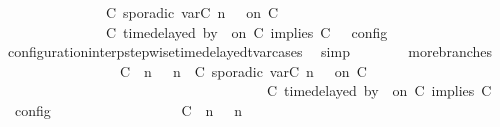 \begin{isabellebody}
\ \ \ \ \ \ \ \ \ \ \ \ \ \ {\isasymturnstile}\ {\isacharparenleft}C\ sporadic{\isasymsharp}\ {\isasymlparr}{\isasymtau}\isactrlsub v\isactrlsub a\isactrlsub r{\isacharparenleft}C\ n{\isacharparenright}\ {\isasymoplus}\ {\isasymdelta}{\isasymtau}{\isasymrparr}\ on\ C\ {\isacharhash}\ {\isasymPsi}\isanewline
\ \ \ \ \ \ \ \ \ \ \ \ \ \ {\isasymtriangleright}\ {\isacharparenleft}{\isacharparenleft}C\ time{\isacharminus}delayed{\isasymbowtie}\ by\ {\isasymdelta}{\isasymtau}\ on\ C\ implies\ C\ {\isacharhash}\ {\isasymPhi}{\isacharparenright}\ {\isasymrbrakk}\isactrlsub c\isactrlsub o\isactrlsub n\isactrlsub f\isactrlsub i\isactrlsub g{\isacartoucheclose}\isanewline
\ \ \ \ \ \ \ \ \isamarkupfalse%
\ configuration{\isacharunderscore}interp{\isacharunderscore}stepwise{\isacharunderscore}timedelayed{\isacharunderscore}tvar{\isacharunderscore}cases\ \isamarkupfalse%
\ simp\isanewline
\ \ \ \ \ \ \isamarkupfalse%
\ more{\isacharunderscore}branches{\isacharcolon}\isanewline
\ \ \ \ \ \ \ \ \ \ \ \ \ \ \ \ {\isacartoucheopen}{\isasymlbrakk}\ {\isacharparenleft}{\isacharparenleft}C\ {\isasymUp}\ n{\isacharparenright}\ {\isacharhash}\ {\isasymGamma}{\isacharparenright}{\isacharcomma}\ n\ {\isasymturnstile}\ {\isacharparenleft}{\isacharparenleft}C\ sporadic{\isasymsharp}\ {\isasymlparr}{\isasymtau}\isactrlsub v\isactrlsub a\isactrlsub r{\isacharparenleft}C\ n{\isacharparenright}\ {\isasymoplus}\ {\isasymdelta}{\isasymtau}{\isasymrparr}\ on\ C\ {\isacharhash}\ {\isasymPsi}{\isacharparenright}\isanewline
\ \ \ \ \ \ \ \ \ \ \ \ \ \ \ \ \ \ \ \ \ \ \ \ \ \ \ \ \ \ \ \ \ \ \ \ \ {\isasymtriangleright}\ {\isacharparenleft}{\isacharparenleft}C\ time{\isacharminus}delayed{\isasymbowtie}\ by\ {\isasymdelta}{\isasymtau}\ on\ C\ implies\ C\ {\isacharhash}\ {\isasymPhi}{\isacharparenright}\ {\isasymrbrakk}\isactrlsub c\isactrlsub o\isactrlsub n\isactrlsub f\isactrlsub i\isactrlsub g\isanewline
\ \ \ \ \ \ \ \ \ \ \ \ \ \ \ \ {\isacharequal}\ {\isasymlbrakk}\ {\isacharparenleft}{\isacharparenleft}C\ {\isasymUp}\ n{\isacharparenright}\ {\isacharhash}\ {\isasymGamma}{\isacharparenright}{\isacharcomma}\ n\ {\isasymturnstile}\ {\isasymPsi}\isanewline

\end{isabellebody}

